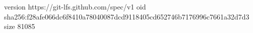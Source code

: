 version https://git-lfs.github.com/spec/v1
oid sha256:f28afe066dc6f8410a78040087dcd9118405cd652746b7176996c7661a32d7d3
size 81085

